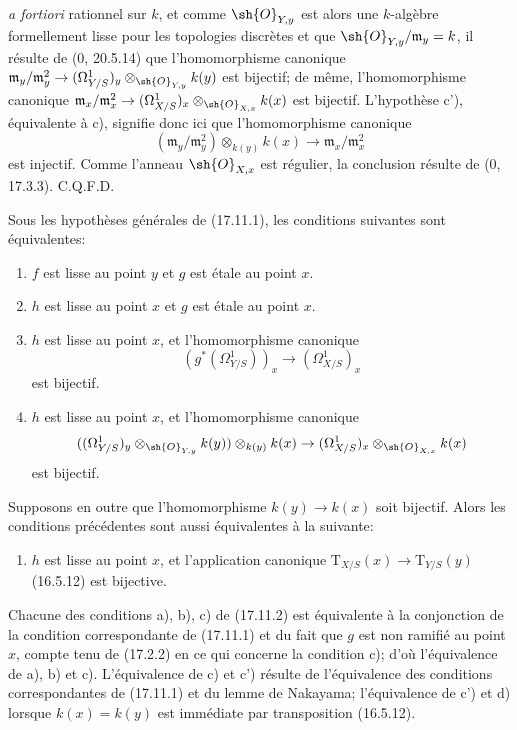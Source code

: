
\emph{a fortiori} rationnel sur $k$, et comme $\sh{O}_{Y,y}$ est alors une $k$-algèbre formellement lisse pour les topologies discrètes et que $\sh{O}_{Y,y}/\mathfrak m_y=k$, il résulte de (0, 20.5.14) que l'homomorphisme canonique $\mathfrak m_y/\mathfrak m_y^2\to(\Omega^1_{Y/S})_y\otimes_{\sh{O}_{Y,y}}k(y)$ est bijectif; de même, l'homomorphisme canonique $\mathfrak m_x/\mathfrak m_x^2\to(\Omega^1_{X/S})_x\otimes_{\sh{O}_{X,x}}k(x)$ est bijectif. L'hypothèse c'), équivalente à c), signifie donc ici que l'homomorphisme canonique
\[
(\mathfrak m_y/\mathfrak m_y^2)\otimes_{k(y)}k(x)\to\mathfrak m_x/\mathfrak m_x^2
\]
est injectif. Comme l'anneau $\sh{O}_{X,x}$ est régulier, la conclusion résulte de (0, 17.3.3). C.Q.F.D.

\begin{corollary}[17.11.2]
\label{IV.17.11.2}
Sous les hypothèses générales de (17.11.1), les conditions suivantes sont équivalentes:
\begin{enumerate}
  \item[a)] $f$ est lisse au point $y$ et $g$ est étale au point $x$.
  \item[b)] $h$ est lisse au point $x$ et $g$ est étale au point $x$.
  \item[c)] $h$ est lisse au point $x$, et l'homomorphisme canonique
  \[
  (g^*(\Omega^1_{Y/S}))_x\to(\Omega^1_{X/S})_x
  \]
  est bijectif.
  \item[c')] $h$ est lisse au point $x$, et l'homomorphisme canonique
  \[
  ((\Omega^1_{Y/S})_y\otimes_{\sh{O}_{Y,y}}k(y))\otimes_{k(y)}k(x)\to(\Omega^1_{X/S})_x\otimes_{\sh{O}_{X,x}}k(x)
  \]
  est bijectif.
\end{enumerate}
Supposons en outre que l'homomorphisme $k(y)\to k(x)$ soit bijectif. Alors les conditions précédentes sont aussi équivalentes à la suivante:
\begin{enumerate}
  \item[d)] $h$ est lisse au point $x$, et l'application canonique $\mathrm{T}_{X/S}(x)\to\mathrm{T}_{Y/S}(y)$ (16.5.12) est bijective.
\end{enumerate}
\end{corollary}

Chacune des conditions a), b), c) de (17.11.2) est équivalente à la conjonction de la condition correspondante de (17.11.1) et du fait que $g$ est non ramifié au point $x$, compte tenu de (17.2.2) en ce qui concerne la condition c); d'où l'équivalence de a), b) et c). L'équivalence de c) et c') résulte de l'équivalence des conditions correspondantes de (17.11.1) et du lemme de Nakayama; l'équivalence de c') et d) lorsque $k(x)=k(y)$ est immédiate par transposition (16.5.12).

